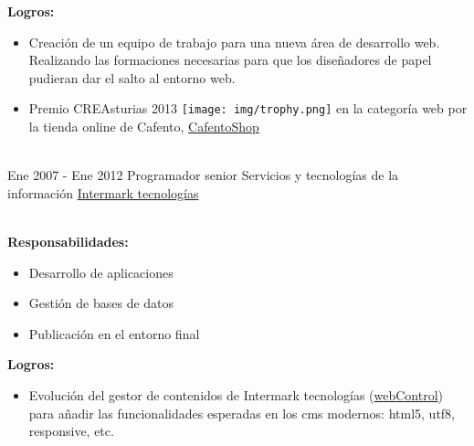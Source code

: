 \documentclass[letterpaper]{twentysecondcv} %
\begin{document}
\begin{twenty}
{		\textbf{Logros:}
		\begin{itemize}
			\item Creación de un equipo de trabajo para una nueva área de desarrollo web. Realizando las formaciones necesarias para que los diseñadores de papel pudieran dar el salto al entorno web.
			\item Premio CREAsturias 2013 {\texttt{[image: img/trophy.png]}} en la categoría web por la tienda online de Cafento, \href{https://www.cafentoshop.com/}{CafentoShop}
		\end{itemize}
	}
	\\
	\twentyitem%
	{Ene 2007 -}
	{Ene 2012}
	{Programador senior}
	{Servicios y tecnologías de la información}
	{\href{http://www.intermarktecnologias.com/}{Intermark tecnologías}}
	{\\
		\textbf{Responsabilidades:}
		\begin{itemize}
			\item Desarrollo de aplicaciones
			\item Gestión de bases de datos
			\item Publicación en el entorno final
		\end{itemize}

		\textbf{Logros:}
		\begin{itemize}
			\item Evolución del gestor de contenidos de Intermark tecnologías (\href{http://www.webcontrol.es/es/}{webControl}) para añadir las funcionalidades esperadas en los cms modernos: html5, utf8, responsive, etc.
		\end{itemize}
	}

\end{twenty}
\end{document}
